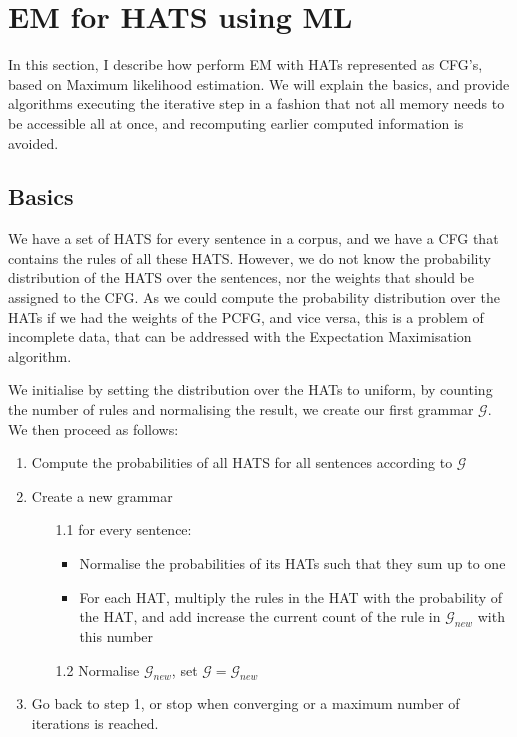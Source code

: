 \documentclass{article}
\newcommand{\G}{\mathcal{G}}
\begin{document}
\section{EM for HATS using ML}

In this section, I describe how perform EM with HATs represented as CFG's, based on Maximum likelihood estimation. We will explain the basics, and provide algorithms executing the iterative step in a fashion that not all memory needs to be accessible all at once, and recomputing earlier computed information is avoided.

\subsection{Basics}

We have a set of HATS for every sentence in a corpus, and we have a CFG that contains the rules of all these HATS. However, we do not know the probability distribution of the HATS over the sentences, nor the weights that should be assigned to the CFG. As we could compute the probability distribution over the HATs if we had the weights of the PCFG, and vice versa, this is a problem of incomplete data, that can be addressed with the Expectation Maximisation algorithm.

We initialise by setting the distribution over the HATs to uniform, by counting the number of rules and normalising the result, we create our first grammar $\G$. We then proceed as follows:\begin{enumerate}
\item Compute the probabilities of all HATS for all sentences according to $\G$ 
\item Create a new grammar
	\begin{enumerate}
		\item[1.1] for every sentence:
			\begin{itemize}
				\item Normalise the probabilities of its HATs such that they sum up to one
				\item For each HAT, multiply the rules in the HAT with the probability of the HAT, and add increase the current count of the rule in $\G_{new}$ with this number
			\end{itemize}
		\item[1.2] Normalise $\G_{new}$, set $\G = \G_{new}$
	\end{enumerate}
\item Go back to step 1, or stop when converging or a maximum number of iterations is reached. 
\end{enumerate}
\end{document}
